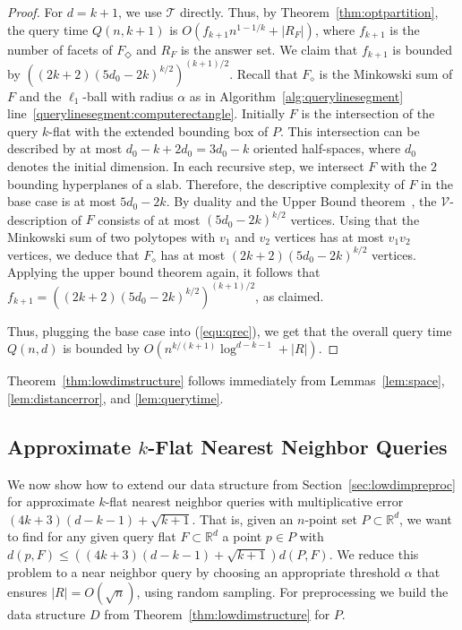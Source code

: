 \documentclass[a4paper,11pt]{paper}
\newcommand{\mathset}[1]{\ensuremath {\mathbb {#1}}}
\newcommand{\R}{\mathset{R}}
\newcommand{\lowdimapprox}[1][]{(4k+3)(d#1-k-1)+\sqrt{k+1}}
\begin{document}
\begin{proof}
  \newcommand{\magicnumber}{((2k+2)(5d_0 - 2k)^{k/2})^{(k+1)/2}}
  For $d = k+1$, we use $\mathcal{T}$ directly.
  Thus, by Theorem~\ref{thm:optpartition}, the query time $Q(n, k+1)$
  is $O(f_{k+1}n^{1-1/k} + |R_F|)$, where
  $f_{k+1}$ is the number of facets of $F_\Diamond$ and
  $R_F$ is the answer set.
  We claim that
  $f_{k+1}$ is bounded by $\magicnumber$.
  Recall that $F_{\diamond}$ is the Minkowski sum of $F$ and
  the $\ell_1$-ball with radius
  $\alpha$ as in Algorithm~\ref{alg:querylinesegment}
  line~\ref{querylinesegment:computerectangle}.
  Initially $F$ is the intersection of the query $k$-flat with the
  extended bounding box of $P$. This intersection can
  be described by at most
  $d_0-k+2d_0=3d_0-k$ oriented half-spaces, where $d_0$ denotes
  the initial dimension. In each recursive
  step, we intersect $F$ with the $2$ bounding hyperplanes of a slab.
  Therefore, the descriptive complexity of $F$ in the base case is
  at most $5d_0-2k$. By duality and the Upper Bound
  theorem~\cite{Matousek02}, the $\mathcal{V}$-description of
  $F$ consists of at most $(5d_0 - 2k)^{k/2}$ vertices. Using
  that the Minkowski sum of two
  polytopes with $v_1$ and $v_2$ vertices has at most
  $v_1v_2$ vertices, we deduce that $F_\diamond$ has at
  most $(2k+2)(5d_0 - 2k)^{k/2}$ vertices.
  Applying the upper bound theorem again, it follows that
  $f_{k+1} = \magicnumber$, as claimed.


  Thus, plugging the base case into (\ref{equ:qrec}),
  we get that the overall query time $Q(n,d)$ is  bounded by
  $O(n^{k/(k+1)}\log^{d-k-1} + |R|)$.
\end{proof}

Theorem~\ref{thm:lowdimstructure} follows immediately from
Lemmas~\ref{lem:space}, \ref{lem:distancerror}, and
\ref{lem:querytime}.

\subsection{Approximate $k$-Flat Nearest Neighbor Queries}
\label{sec:approximateNNlowdim}
We now show how to extend our
data structure from Section~\ref{sec:lowdimpreproc}
for approximate $k$-flat nearest neighbor queries with
multiplicative error $\lowdimapprox$.
That is, given an $n$-point set
$P \subset \R^d$, we want to find for any
given query flat $F \subset \R^d$
a point $p \in P$ with $d(p,F) \leq (\lowdimapprox) d(P,F)$.
We reduce this problem to a near neighbor query by choosing an
appropriate
threshold $\alpha$ that ensures
$|R| = O(\sqrt{n})$, using random sampling.
For preprocessing we build the data structure $D$ from
Theorem~\ref{thm:lowdimstructure} for $P$.
\end{document}
